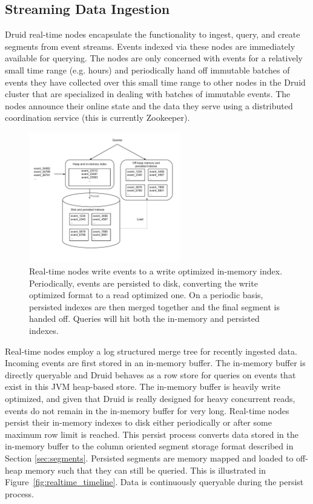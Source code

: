 \documentclass{vldb}
\begin{document}
\subsection{Streaming Data Ingestion}
Druid real-time nodes encapsulate the functionality to ingest, query, and create
segments from event streams. Events indexed via these nodes are immediately
available for querying.  The nodes are only concerned with events for a relatively
small time range (e.g. hours) and periodically hand off immutable batches of events they
have collected over this small time range to other nodes in the Druid cluster
that are specialized in dealing with batches of immutable events. The nodes
announce their online state and the data they serve using a distributed
coordination service (this is currently Zookeeper\cite{hunt2010zookeeper}).

\begin{figure}
\centering
\includegraphics[width = 2.6in]{realtime_flow} 
\caption{
Real-time nodes write events to a write optimized in-memory index.
Periodically, events are persisted to disk, converting the write optimized
format to a read optimized one. On a periodic basis, persisted indexes are
then merged together and the final segment is handed off.  Queries will hit
both the in-memory and persisted indexes.  
}
\label{fig:realtime_flow}
\end{figure}

Real-time nodes employ a log structured merge tree\cite{o1996log} for recently
ingested data. Incoming events are first stored in an in-memory buffer. The
in-memory buffer is directly queryable and Druid behaves as a row store for
queries on events that exist in this JVM heap-based store. The in-memory buffer
is heavily write optimized, and given that Druid is really designed for heavy
concurrent reads, events do not remain in the in-memory buffer for very long.
Real-time nodes persist their in-memory indexes to disk either periodically or
after some maximum row limit is reached. This persist process converts data
stored in the in-memory buffer to the column oriented segment storage format
described in Section \ref{sec:segments}.  Persisted segments are memory mapped
and loaded to off-heap memory such that they can still be queried. This is
illustrated in Figure~\ref{fig:realtime_timeline}. Data is continuously
queryable during the persist process.
\end{document}
